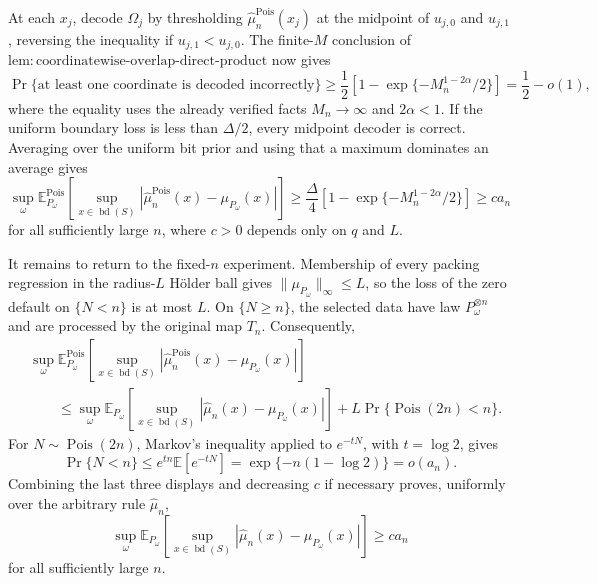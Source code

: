 At each \(x_j\), decode \(\Omega_j\) by thresholding \(\widehat\mu_n^{\mathrm{Pois}}(x_j)\) at the midpoint of \(u_{j,0}\) and \(u_{j,1}\), reversing the inequality if \(u_{j,1}<u_{j,0}\).  The finite-\(M\) conclusion of \(\mathrm{lem:coordinatewise\text{-}overlap\text{-}direct\text{-}product}\) now gives
\[
 \Pr\{\text{at least one coordinate is decoded incorrectly}\}
 \geq\frac12\left[1-\exp\{-M_n^{1-2\alpha}/2\}\right]
 =\frac12-o(1),
\]
where the equality uses the already verified facts \(M_n\to\infty\) and \(2\alpha<1\).  If the uniform boundary loss is less than \(\Delta/2\), every midpoint decoder is correct.  Averaging over the uniform bit prior and using that a maximum dominates an average gives
\[
 \sup_\omega
 \mathbb E_{P_\omega}^{\mathrm{Pois}}\!\left[
 \sup_{x\in\operatorname{bd}(S)}
 |\widehat\mu_n^{\mathrm{Pois}}(x)-\mu_{P_\omega}(x)|
 \right]
 \geq\frac{\Delta}{4}
 \left[1-\exp\{-M_n^{1-2\alpha}/2\}\right]
 \geq c a_n
\]
for all sufficiently large \(n\), where \(c>0\) depends only on \(q\) and \(L\).

It remains to return to the fixed-\(n\) experiment.  Membership of every packing regression in the radius-\(L\) H\"older ball gives \(\lVert\mu_{P_\omega}\rVert_\infty\leq L\), so the loss of the zero default on \(\{N<n\}\) is at most \(L\).  On \(\{N\geq n\}\), the selected data have law \(P_\omega^{\otimes n}\) and are processed by the original map \(T_n\).  Consequently,
\[
\begin{aligned}
 &\sup_\omega
 \mathbb E_{P_\omega}^{\mathrm{Pois}}\!\left[
 \sup_{x\in\operatorname{bd}(S)}
 |\widehat\mu_n^{\mathrm{Pois}}(x)-\mu_{P_\omega}(x)|
 \right]\\
 &\qquad\leq
 \sup_\omega
 \mathbb E_{P_\omega}\!\left[
 \sup_{x\in\operatorname{bd}(S)}
 |\widehat\mu_n(x)-\mu_{P_\omega}(x)|
 \right]
 +L\Pr\{\operatorname{Pois}(2n)<n\}.
\end{aligned}
\]
For \(N\sim\operatorname{Pois}(2n)\), Markov's inequality applied to \(e^{-tN}\), with \(t=\log2\), gives
\[
 \Pr\{N<n\}
 \leq e^{tn}\mathbb E[e^{-tN}]
 =\exp\{-n(1-\log2)\}
 =o(a_n).
\]
Combining the last three displays and decreasing \(c\) if necessary proves, uniformly over the arbitrary rule \(\widehat\mu_n\),
\[
 \sup_\omega
 \mathbb E_{P_\omega}\!\left[
 \sup_{x\in\operatorname{bd}(S)}
 |\widehat\mu_n(x)-\mu_{P_\omega}(x)|
 \right]
 \geq c a_n
\]
for all sufficiently large \(n\).

